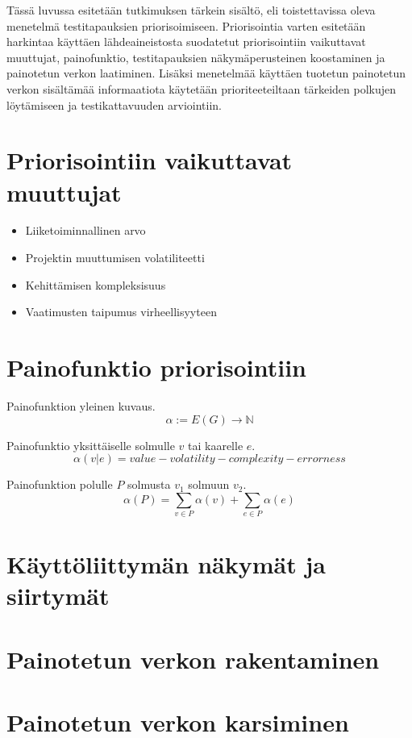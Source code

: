 Tässä luvussa esitetään tutkimuksen tärkein sisältö, eli toistettavissa oleva menetelmä testitapauksien priorisoimiseen.
Priorisointia varten esitetään harkintaa käyttäen lähdeaineistosta suodatetut priorisointiin vaikuttavat muuttujat, painofunktio, testitapauksien näkymäperusteinen koostaminen ja painotetun verkon laatiminen.
Lisäksi menetelmää käyttäen tuotetun painotetun verkon sisältämää informaatiota käytetään prioriteeteiltaan tärkeiden polkujen löytämiseen ja testikattavuuden arviointiin.

\section{Priorisointiin vaikuttavat muuttujat}

\begin{itemize}
  \item Liiketoiminnallinen arvo
  \item Projektin muuttumisen volatiliteetti
  \item Kehittämisen kompleksisuus
  \item Vaatimusten taipumus virheellisyyteen
\end{itemize}

\section{Painofunktio priorisointiin}

Painofunktion yleinen kuvaus.
\[\alpha := E(G) \rightarrow \mathbb{N}\]

Painofunktio yksittäiselle solmulle \(v\) tai kaarelle \(e\).
\[\alpha(v|e) = value - volatility - complexity - errorness\]

Painofunktion polulle \(P\) solmusta \(v_1\) solmuun \(v_2\).
\[\alpha(P) = \sum_{v \in P} \alpha(v) + \sum_{e \in P} \alpha(e)\]

\section{Käyttöliittymän näkymät ja siirtymät}

\section{Painotetun verkon rakentaminen}

\section{Painotetun verkon karsiminen}

